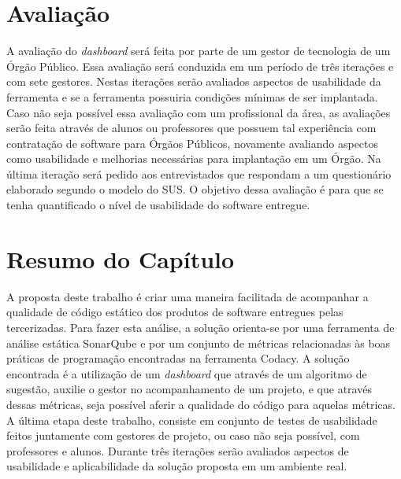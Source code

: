 \section{Avaliação}

A avaliação do \textit{dashboard} será feita por parte de um gestor de tecnologia de um Órgão Público. Essa avaliação será conduzida em um período de três iterações e com sete gestores. Nestas iterações serão avaliados aspectos de usabilidade da ferramenta e se a ferramenta possuiria condições mínimas de ser implantada. Caso não seja possível essa avaliação com um profissional da área, as avaliações serão feita através de alunos ou professores que possuem tal experiência com contratação de software para Órgãos Públicos, novamente avaliando aspectos como usabilidade e melhorias necessárias para implantação em um Órgão. Na última iteração será pedido aos entrevistados que respondam a um questionário elaborado segundo o modelo do SUS. O objetivo dessa avaliação é para que se tenha quantificado o nível de usabilidade do software entregue.


\section{Resumo do Capítulo}

A proposta deste trabalho é criar uma maneira facilitada de acompanhar a qualidade de código estático dos produtos de software entregues pelas tercerizadas. Para fazer esta análise, a solução orienta-se por uma ferramenta de análise estática SonarQube e por um conjunto de métricas relacionadas às boas práticas de programação encontradas na ferramenta Codacy. A solução encontrada é a utilização de um \textit{dashboard} que através de um algoritmo de sugestão, auxilie o gestor no acompanhamento de um projeto, e que através dessas métricas, seja possível aferir a qualidade do código para aquelas métricas. A última etapa deste trabalho, consiste em conjunto de testes de usabilidade feitos juntamente com gestores de projeto, ou caso não seja possível, com professores e alunos. Durante três iterações serão avaliados aspectos de usabilidade e aplicabilidade da solução proposta em um ambiente real.